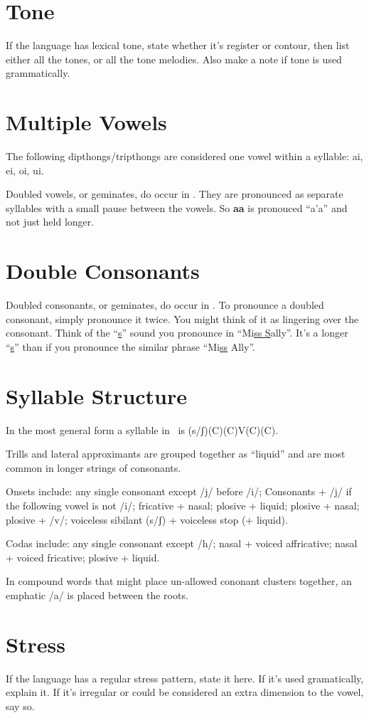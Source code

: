 \section{Tone}

If the language has lexical tone, state whether it’s register or contour, then list either all the tones, or all the tone melodies.
Also make a note if tone is used grammatically.

\section{Multiple Vowels}

The following dipthongs/tripthongs are considered one vowel within a syllable: ai, ei, oi, ui.

Doubled vowels, or geminates, do occur in \LanguageName.
They are pronounced as separate syllables with a small pause between the vowels.
So \textbf{aa} is pronouced ``a'a'' and not just held longer.

\section{Double Consonants}

Doubled consonants, or geminates, do occur in \LanguageName.
To pronounce a doubled consonant, simply pronounce it twice.
You might think of it as lingering over the consonant.
Think of the ``\uline{s}'' sound you pronounce in ``Mi\uline{ss S}ally''.
It's a longer ``\uline{s}'' than if you pronounce the similar phrase ``Mi\uline{ss} Ally''.

\section{Syllable Structure}

In the most general form a syllable in \LanguageName\ is (s/ʃ)(C)(C)V(C)(C).

Trills and lateral approximants are grouped together as ``liquid'' and are most common in longer strings of consonants.

Onsets include:
any single consonant except /j/ before /i/;
Consonants + /j/ if the following vowel is not /i/;
fricative + nasal;
plosive + liquid;
plosive + nasal;
plosive + /v/;
voiceless sibilant (s/ʃ) + voiceless stop (+ liquid).

Codas include:
any single consonant except /h/;
nasal + voiced affricative;
nasal + voiced fricative;
plosive + liquid.

In compound words that might place un-allowed cononant clusters together, an emphatic /a/ is placed between the roots.

\section{Stress}

If the language has a regular stress pattern, state it here.
If it's used gramatically, explain it.
If it's irregular or could be considered an extra dimension to the vowel, say so.


